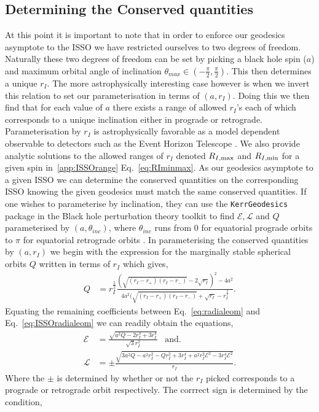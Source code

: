 \documentclass[12pt, amsmath]{revtex4-2}
\newcommand\EN{\mathcal{E}}
\newcommand\ANG{\mathcal{L}}
\begin{document}
\subsection{Determining the Conserved quantities}

At this point it is important to note that in order to enforce our geodesics asymptote to the ISSO we have restricted ourselves to two degrees of freedom. Naturally these two degrees of freedom can be set by picking a black hole spin ($a$) and maximum orbital angle of inclination $\theta_{max} \in (-\frac{\pi}{2},\frac{\pi}{2})$. This then determines a unique $r_I$. The more astrophysically interesting case however is when we invert this relation to set our parameterisation in terms of $(a,r_I)$. Doing this we then find that for each value of $a$ there exists a range of allowed $r_I$'s each of which corresponds to a unique inclination either in prograde or retrograde. Parameterisation by $r_{I}$ is astrophysically favorable as a model dependent observable to detectors such as the Event Horizon Telescope \cite{2019ApJS..243...26P}. We also provide analytic solutions to the allowed ranges of $r_I$ denoted $R_{I, \rm max}$ and $R_{I, \rm min}$ for a given spin in~\ref{app:ISSOrange}
Eq.~\eqref{eq:RIminmax}. As our geodesics asymptote to a given ISSO we can determine the conserved quantities on the corresponding ISSO knowing the given geodesics must match the same conserved quantities. If one wishes to parameterise by inclination, they can use the {\tt KerrGeodesics} package in the Black hole perturbation theory toolkit \cite{BHPToolkit} to find $\EN,\ANG$ and $Q$ parameterised by $(a,\theta_{inc})$, where $\theta_{inc}$ runs from $0$ for equatorial prograde orbits to $\pi$ for equatorial retrograde orbits \cite{Drasco:2005kz}. In parameterising the conserved quantities by $(a,r_I)$ we begin with the expression for the marginally stable spherical orbits $Q$ written in terms of $r_I$ \cite{Teo:2020sey} which gives,
\begin{align}\label{eq:carter}
    Q &= r_I^{\frac{5}{2}}\frac{(\sqrt{(r_I-r_{+})(r_I-r_{-})}-2\sqrt{r_I})^2-4a^2}{4a^2(\sqrt{(r_I-r_{+})(r_I-r_{-})}+\sqrt{r_I}-r_I^{\frac{3}{2}}}.
\end{align}
Equating the remaining coefficients between Eq.~\eqref{eq:radialeom} and  Eq.~\eqref{eq:ISSOradialeom}  we can readily obtain the equations,
\begin{align}
    \EN &= \frac{\sqrt{a^2Q-2r_I^3+3r_I^4}}{\sqrt{3}r_I^2}\;\;\;\text{and}. \label{eq:EN}\\
    \ANG &= \pm\frac{\sqrt{3a^2Q-a^2r_I^2-Qr_I^2+3r_I^4+a^2 r_I^2\EN^2-3r_I^4\EN^2}}{r_I}.\label{eq:ANG}
\end{align}
Where the $\pm$ is determined by whether or not the $r_{I}$ picked corresponds to a prograde or retrograde orbit respectively. The corrrect sign is determined  by the condition, 
\end{document}
